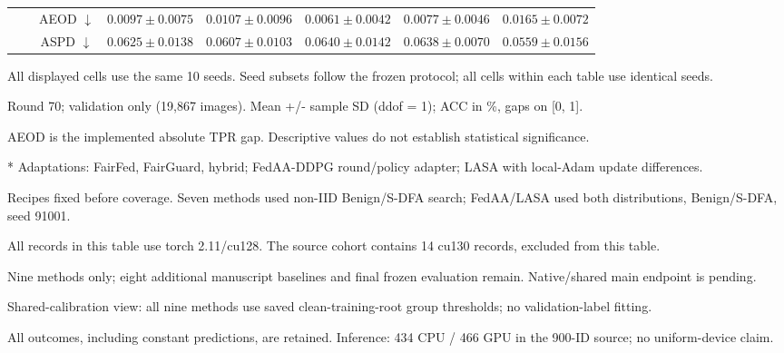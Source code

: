 \begin{table}[t]
{\begin{tabular}{l|l|c|ccccc}
 &  & AEOD $\downarrow$ & $0.0097 \pm 0.0075$ & $0.0107 \pm 0.0096$ & $0.0061 \pm 0.0042$ & $0.0077 \pm 0.0046$ & $0.0165 \pm 0.0072$ \\
 &  & ASPD $\downarrow$ & $0.0625 \pm 0.0138$ & $0.0607 \pm 0.0103$ & $0.0640 \pm 0.0142$ & $0.0638 \pm 0.0070$ & $0.0559 \pm 0.0156$ \\
\hline\hline
\end{tabular}}
\par\smallskip
\begin{minipage}{\textwidth}\scriptsize
All displayed cells use the same 10 seeds. Seed subsets follow the frozen protocol; all cells within each table use identical seeds.\par
Round 70; validation only (19,867 images). Mean +/- sample SD (ddof = 1); ACC in \%, gaps on [0, 1].\par
AEOD is the implemented absolute TPR gap. Descriptive values do not establish statistical significance.\par
* Adaptations: FairFed, FairGuard, hybrid; FedAA-DDPG round/policy adapter; LASA with local-Adam update differences.\par
Recipes fixed before coverage. Seven methods used non-IID Benign/S-DFA search; FedAA/LASA used both distributions, Benign/S-DFA, seed 91001.\par
All records in this table use torch 2.11/cu128. The source cohort contains 14 cu130 records, excluded from this table.\par
Nine methods only; eight additional manuscript baselines and final frozen evaluation remain. Native/shared main endpoint is pending.\par
Shared-calibration view: all nine methods use saved clean-training-root group thresholds; no validation-label fitting.\par
All outcomes, including constant predictions, are retained. Inference: 434 CPU / 466 GPU in the 900-ID source; no uniform-device claim.\par
\end{minipage}
\end{table}
